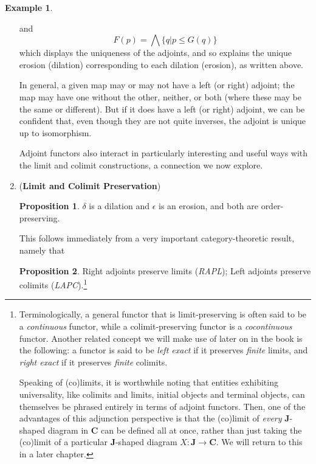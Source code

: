 \documentclass[11pt]{book}
\theoremstyle{definition}
\newtheorem{example}{Example}[section]
\theoremstyle{definition}
\theoremstyle{definition}
\newtheorem{proposition}{Proposition}[section]
\theoremstyle{theorem}
\theoremstyle{definition}
\begin{document}
\begin{example}
\begin{enumerate}
and 
\begin{equation*}
F(p) = \bigwedge \{q | p \leq G(q)\}
\end{equation*}
which displays the uniqueness of the adjoints, and so explains the unique erosion (dilation) corresponding to each dilation (erosion), as written above. \par 
In general, a given map may or may not have a left (or right) adjoint; the map may have one without the other, neither, or both (where these may be the same or different). But if it does have a left (or right) adjoint, we can be confident that, even though they are not quite inverses, the adjoint is unique up to isomorphism. \par 
Adjoint functors also interact in particularly interesting and useful ways with the limit and colimit constructions, a connection we now explore. \par 
	\item (\textbf{Limit and Colimit Preservation}) 
	\begin{proposition} $\delta$ is a dilation and $\epsilon$ is an erosion, and both are order-preserving. 
	\end{proposition} 
This follows immediately from a very important category-theoretic result, namely that 
	\begin{proposition}
		Right adjoints preserve limits (\textit{RAPL}); Left adjoints preserve colimits (\textit{LAPC}).\footnote{Terminologically, a general functor that is limit-preserving is often said to be a \textit{continuous} functor, while a colimit-preserving functor is a \textit{cocontinuous} functor. Another related concept we will make use of later on in the book is the following: a functor is said to be \textit{left exact} if it preserves \textit{finite} limits, and \textit{right exact} if it preserves \textit{finite} colimits.\par 
		Speaking of (co)limits, it is worthwhile noting that entities exhibiting universality, like colimits and limits, initial objects and terminal objects, can themselves be phrased entirely in terms of adjoint functors. Then, one of the advantages of this adjunction perspective is that the (co)limit of \textit{every} \textbf{J}-shaped diagram in $\textbf{C}$ can be defined all at once, rather than just taking the (co)limit of a particular $\textbf{J}$-shaped diagram $X: \textbf{J} \rightarrow \textbf{C}$. We will return to this in a later chapter.} 
	\end{proposition} 

\end{enumerate}
\end{example}
\end{document}
